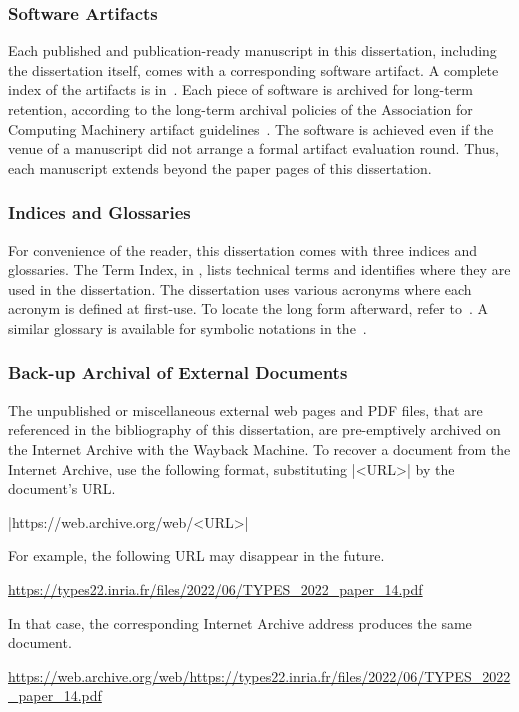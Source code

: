 \subsubsection{Software Artifacts}\label{subsub:sw}
Each published and publication-ready manuscript in this dissertation, including the dissertation itself, comes with a corresponding software artifact.
A complete index of the artifacts is in~.
Each piece of software is archived for long-term retention, according to the long-term archival policies of the Association for Computing Machinery artifact guidelines~\cite{acm_badging}.
The software is achieved even if the venue of a manuscript did not arrange a formal artifact evaluation round.
Thus, each manuscript extends beyond the paper pages of this dissertation.

\subsubsection{Indices and Glossaries}

For convenience of the reader, this dissertation comes with three indices and glossaries.
The Term Index, in , lists technical terms and identifies where they are used in the dissertation.
The dissertation uses various acronyms where each acronym is defined at first-use.
To locate the long form afterward, refer to~\aref{\acronymtype}.
A similar glossary is available for symbolic notations in the~.

\subsubsection{Back-up Archival of External Documents}

The unpublished or miscellaneous external web pages and PDF files, that are referenced in the bibliography of this dissertation,
are pre-emptively archived on the Internet Archive with the Wayback Machine.
To recover a document from the Internet Archive, use the following format, substituting \pr|<URL>| by the document's URL\@.
\begin{center}
    \pr|https://web.archive.org/web/<URL>|
\end{center}
For example, the following URL may disappear in the future.
\begin{center}
    \url{https://types22.inria.fr/files/2022/06/TYPES_2022_paper_14.pdf}
\end{center}
In that case, the corresponding Internet Archive address produces the same document.
\begin{center}
    \url{https://web.archive.org/web/https://types22.inria.fr/files/2022/06/TYPES_2022_paper_14.pdf}
\end{center}

